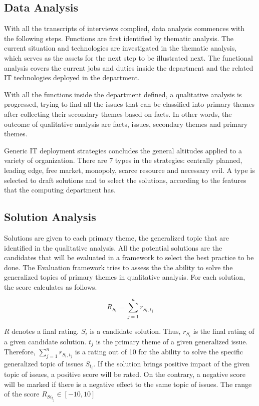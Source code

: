 \subsection{Data Analysis}
With all the transcripts of interviews complied, data analysis commences with the following steps. 
Functions are first identified by thematic analysis. The current situation and technologies are investigated in the thematic analysis, which serves as the assets for the next step to be illustrated next. The functional analysis covers the current jobs and duties inside the department and the related IT technologies deployed in the department.

With all the functions inside the department defined, a qualitative analysis is progressed, trying to find all the issues that can be classified into primary themes after collecting their secondary themes based on facts. In other words, the outcome of qualitative analysis are facts, issues, secondary themes and primary themes.

Generic IT deployment strategies concludes the general altitudes applied to a variety of organization. There are 7 types in the strategies: centrally planned, leading edge, free market, monopoly, scarce resource and necessary evil. A type is selected to draft solutions and to select the solutions, according to the features that the computing department has.

\subsection{Solution Analysis}
Solutions are given to each primary theme, the generalized topic that are identified in the qualitative analysis. All the potential solutions are the candidates that will be evaluated in a framework to select the best practice to be done.
The Evaluation framework tries to assess the the ability to solve the generalized topics of primary themes in qualitative analysis. For each solution, the score calculates as follows.

$$
R_{S_i} = \sum_{j=1}^n{r_{S_i, t_j}}
$$

$R$ denotes a final rating. $S_i$ is a candidate solution. Thus, $r_{S_i}$ is the final rating of a given candidate solution. $t_j$ is the primary theme of a given generalized issue. Therefore, $\sum_{j=1}^n{r_{S_i, t_j}}$ is a rating out of 10 for the ability to solve the specific generalized topic of issues $S_{t_i}$. If the solution brings positive impact of the given topic of issues, a positive score will be rated. On the contrary, a negative score will be marked if there is a negative effect to the same topic of issues. The range of the score $R_{Si_{t_j}} \in [-10, 10]$

